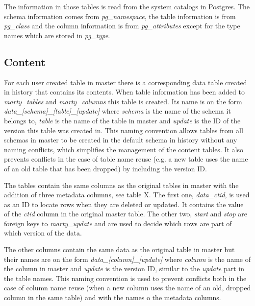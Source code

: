 \documentclass[a4paper,12pt,twoside,BCOR=10mm]{scrbook}
\begin{document}

The information in those tables is read from the system catalogs in Postgres. The schema information comes from \textit{pg\_namespace}, the table information is from \textit{pg\_class} and the column information is from \textit{pg\_attributes} except for the type names which are stored in \textit{pg\_type}.

\subsection{Content}
For each user created table in master there is a corresponding data table created in history that contains its contents. When table information has been added to \textit{marty\_tables} and \textit{marty\_columns} this table is created. Its name is on the form \textit{data\_[schema]\_[table]\_[update]} where \textit{schema} is the name of the schema it belongs to, \textit{table} is the name of the table in master and \textit{update} is the ID of the version this table was created in. This naming convention allows tables from all schemas in master to be created in the default schema in history without any naming conflicts, which simplifies the management of the content tables. It also prevents conflicts in the case of table name reuse (e.g. a new table uses the name of an old table that has been dropped) by including the version ID.

The tables contain the same columns as the original tables in master with the addition of three metadata columns, see table X. The first one, \textit{data\_ctid}, is used as an ID to locate rows when they are deleted or updated. It contains the value of the \textit{ctid} column in the original master table. The other two, \textit{start} and \textit{stop} are foreign keys to \textit{marty\_update} and are used to decide which rows are part of which version of the data.

The other columns contain the same data as the original table in master but their names are on the form \textit{data\_[column]\_[update]} where \textit{column} is the name of the column in master and \textit{update} is the version ID, similar to the \textit{update} part in the table names. This naming convention is used to prevent conflicts both in the case of column name reuse (when a new column uses the name of an old, dropped column in the same table) and with the names o the metadata columns.

\end{document}
